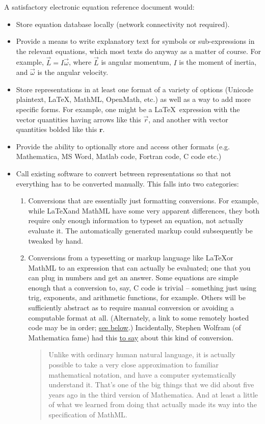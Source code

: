 \documentclass[12pt,letterpaper]{article}
\begin{document}
A satisfactory electronic equation reference document would:

\begin{itemize}
\item Store equation database locally (network connectivity not required).
\item Provide a means to write explanatory text for symbols or sub-expressions in the relevant equations, which most texts do anyway as a matter of course. For example, $\vec{L} = I \vec{\omega}$, where $\vec{L}$ is angular momentum, $I$ is the moment of inertia, and $\vec{\omega}$ is the angular velocity.
\item Store representations in at least one format of a variety of options (Unicode plaintext, \LaTeX, MathML, OpenMath, etc.) as well as a way to add more specific forms. For example, one might be a \LaTeX\ expression with the vector quantities having arrows like this $\vec{r}$, and another with vector quantities bolded like this $\mathbf{r}$.
\item Provide the ability to optionally store and access other formats (e.g. Mathematica, MS Word, Matlab code, Fortran code, C code etc.)
\item Call existing software to convert between representations so that not everything has to be converted manually. This falls into two categories:
\begin{enumerate}
\item Conversions that are essentially just formatting conversions. For example, while \LaTeX and MathML have some very apparent differences, they both require only enough information to typeset an equation, not actually evaluate it. The automatically generated markup could subsequently be tweaked by hand.
\item Conversions from a typesetting or markup language like \LaTeX or MathML to an expression that can actually be evaluated; one that you can plug in numbers and get an answer. Some equations are simple enough that a conversion to, say, C code is trivial -- something just using trig, exponents, and arithmetic functions, for example. Others will be sufficiently abstract as to require manual conversion or avoiding a computable format at all. (Alternately, a link to some remotely hosted code may be in order; \hyperref[linking]{see below}.) Incidentally, Stephen Wolfram (of Mathematica fame) had this \href{http://www.stephenwolfram.com/publications/recent/mathml/mathml1.html} {to say} about this kind of conversion.
\begin{quote}
Unlike with ordinary human natural language, it is actually possible to take a very close approximation to familiar mathematical notation, and have a computer systematically understand it. That's one of the big things that we did about five years ago in the third version of Mathematica. And at least a little of what we learned from doing that actually made its way into the specification of MathML. 

\end{quote}
\end{enumerate}
\end{itemize}
\end{document}

